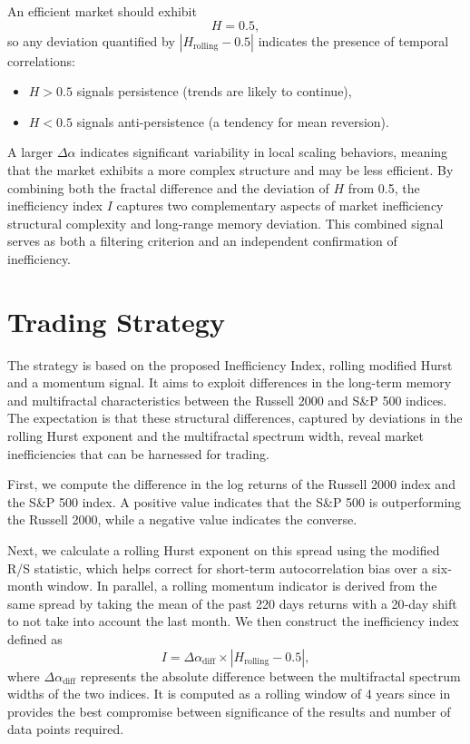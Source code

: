 \documentclass[11pt]{extarticle}
\begin{document}
An efficient market should exhibit
\begin{equation}
H = 0.5,
\end{equation}
so any deviation quantified by $\left|H_{\text{rolling}} - 0.5\right|$ indicates the presence of temporal correlations:
\begin{itemize}
    \item $H>0.5$ signals persistence (trends are likely to continue),
    \item $H<0.5$ signals anti-persistence (a tendency for mean reversion).
\end{itemize}

A larger $\Delta \alpha$ indicates significant variability in local scaling behaviors,
meaning that the market exhibits a more complex structure and may be less efficient. By
combining both the fractal difference and the deviation of $H$ from 0.5, the inefficiency index $I$
captures two complementary aspects of market inefficiency structural complexity and long-range memory deviation.
This combined signal serves as both a filtering criterion and an independent confirmation of inefficiency.



\section{Trading Strategy}

The strategy is based on the proposed Inefficiency Index, rolling modified Hurst and a momentum signal. It aims to exploit differences in the
long-term memory and multifractal characteristics between the Russell 2000 and S\&P 500 indices. The expectation is that
these structural differences, captured by deviations in the rolling Hurst exponent and the multifractal spectrum width,
reveal market inefficiencies that can be harnessed for trading.

First, we compute the difference in the log returns of the Russell 2000 index and the S\&P 500 index. A positive value
indicates that the S\&P 500 is outperforming the Russell 2000, while a negative value indicates the converse.

Next, we calculate a rolling Hurst exponent on this spread using the modified R/S statistic, which helps correct for
short-term autocorrelation bias over a six‐month window. In parallel, a rolling momentum indicator is derived from the
same spread by taking the mean of the past 220 days returns with a 20‐day shift to not take into account the last month.
We then construct the inefficiency index defined as
\[
I = \Delta\alpha_{\text{diff}} \times \left|H_{\text{rolling}} - 0.5\right|,
\]
where \(\Delta \alpha_{\text{diff}}\) represents the absolute difference between the multifractal spectrum widths of the two
indices. It is computed as a rolling window of 4 years since in provides the best compromise between significance of the results
and number of data points required.
\end{document}
